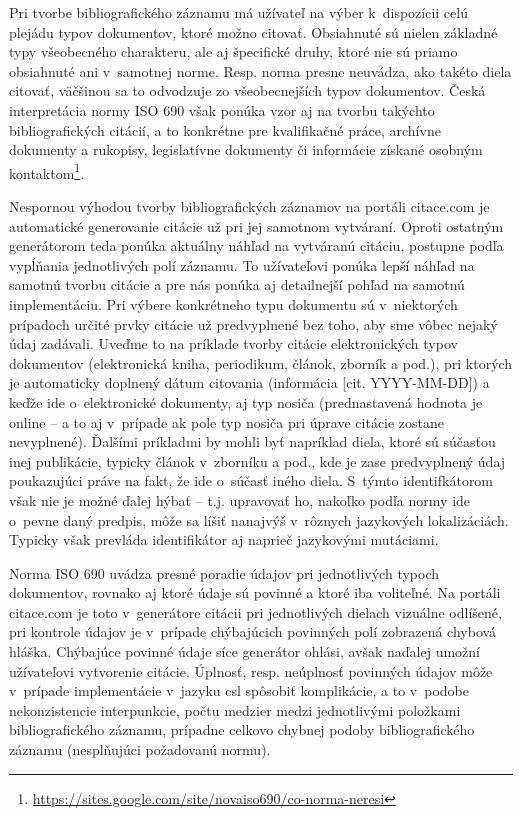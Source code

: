 \documentclass{fithesis3}
\begin{document}
	Pri tvorbe bibliografického záznamu má užívateľ na výber k~dispozícii celú plejádu typov dokumentov, ktoré možno citovať. Obsiahnuté sú nielen základné typy všeobecného charakteru, ale aj špecifické druhy, ktoré nie sú priamo obsiahnuté ani v~samotnej norme. Resp. norma presne neuvádza, ako takéto diela citovať, väčšinou sa to odvodzuje zo všeobecnejších typov dokumentov. Česká interpretácia normy ISO 690 však ponúka vzor aj na tvorbu takýchto bibliografických citácií, a to konkrétne pre kvalifikačné práce, archívne dokumenty a rukopisy, legislatívne dokumenty či informácie získané osobným kontaktom\footnote{\url{https://sites.google.com/site/novaiso690/co-norma-neresi}}.
	
	Nespornou výhodou tvorby bibliografických záznamov na portáli citace.com je automatické generovanie citácie už pri jej samotnom vytváraní. Oproti ostatným generátorom teda ponúka aktuálny náhľad na vytváranú citáciu, postupne podľa vypĺňania jednotlivých polí záznamu. To užívateľovi ponúka lepší náhľad na samotnú tvorbu citácie a pre nás ponúka aj detailnejší pohľad na samotnú implementáciu. Pri výbere konkrétneho typu dokumentu sú v~niektorých prípadoch určité prvky citácie už predvyplnené bez toho, aby sme vôbec nejaký údaj zadávali. Uveďme to na príklade tvorby citácie elektronických typov dokumentov (elektronická kniha, periodikum, článok, zborník a pod.), pri ktorých je automaticky doplnený dátum citovania (informácia [cit. YYYY-MM-DD]) a keďže ide o~elektronické dokumenty, aj typ nosiča (prednastavená hodnota je online -- a to aj v~prípade ak pole typ nosiča pri úprave citácie zostane nevyplnené). Ďalšími príkladmi by mohli byť napríklad diela, ktoré sú súčasťou inej publikácie, typicky článok v~zborníku a pod., kde je zase predvyplnený údaj  poukazujúci práve na fakt, že ide o~súčasť iného diela. S~týmto identifkátorom však nie je možné ďalej hýbať -- t.j. upravovať ho, nakoľko podľa normy ide o~pevne daný predpis, môže sa líšiť nanajvýš v~rôznych jazykových lokalizáciách. Typicky však prevláda identifikátor  aj naprieč jazykovými mutáciami.
	
	Norma ISO 690 uvádza presné poradie údajov pri jednotlivých typoch dokumentov, rovnako aj ktoré údaje sú povinné a ktoré iba voliteľné. Na portáli citace.com je toto v~generátore citácii pri jednotlivých dielach vizuálne odlíšené, pri kontrole údajov je v~prípade chýbajúcich povinných polí zobrazená chybová hláška. Chýbajúce povinné údaje síce generátor ohlási, avšak naďalej umožní užívateľovi vytvorenie citácie. Úplnosť, resp. neúplnosť povinných údajov môže v~prípade implementácie v~jazyku csl spôsobiť komplikácie, a to v~podobe nekonzistencie interpunkcie, počtu medzier medzi jednotlivými položkami bibliografického záznamu, prípadne celkovo chybnej podoby bibliografického záznamu (nesplňujúci požadovanú normu).
	
\end{document}

